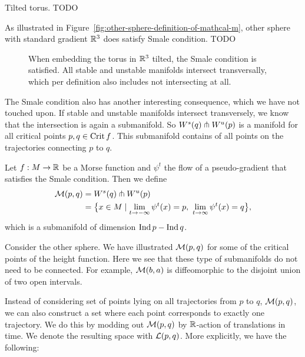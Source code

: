     \begin{eg}
        Tilted torus. TODO
    \end{eg}
    \begin{eg}
        As illustrated in Figure~\ref{fig:other-sphere-definition-of-mathcal-m}, other sphere with standard gradient $\mathbb{R}^3$ does satisfy Smale condition. TODO
    \end{eg}
\begin{figure}[H]
    \centering
    \caption{
        When embedding the torus in $\mathbb{R}^3$ tilted, the Smale condition is satisfied. All stable and unstable manifolds intersect transversally, which per definition also includes not intersecting at all.
    }
    \label{fig:torus-tilted-height-function-stable-and-unstable-manifolds}
\end{figure}

The Smale condition also has another interesting consequence, which we have not touched upon.
If stable and unstable manifolds intersect transversely, we know that the intersection is again a submanifold.
So $W^s(q) \pitchfork W^u(p)$ is a manifold for all critical points $p, q \in \operatorname{Crit} f$.
This submanifold contains of all points on the trajectories connecting $p$ to $q$.
 \begin{definition}
    Let $f: M \to  \mathbb{R}$ be a Morse function and $\psi^{t}$ the flow of a pseudo-gradient that satisfies the Smale condition.
    Then we define
    \begin{align*}
        \traj{p}{q} &= \stable{q} \tcap \unstable{p}\\
                    &= \big\{
            x \in M 
            \mid 
            \lim_{t \to -\infty} \psi^{t}(x) = p, \ 
            \lim_{t \to \infty} \psi^{t}(x) = q
        \big\} 
    ,\end{align*} 
    which is a submanifold of dimension $\operatorname{Ind} p - \operatorname{Ind} q$.
\end{definition}

\begin{eg}
    Consider the other sphere. 
    We have illustrated $\mathcal M(p, q)$ for some of the critical points of the height function.
    Here we see that these type of submanifolds do not need to be connected. For example, $\mathcal M(b, a)$ is diffeomorphic to the disjoint union of two open intervals.
\end{eg}

Instead of considering set of points lying on all trajectories from $p$ to $q$, $\mathcal M(p, q)$, we can also construct a set where each point corresponds to exactly one trajectory.
We do this by modding out $\mathcal M(p, q)$ by $\mathbb{R}$-action of translations in time. We denote the resulting space with $\mathcal L(p, q)$.
More explicitly, we have the following:

